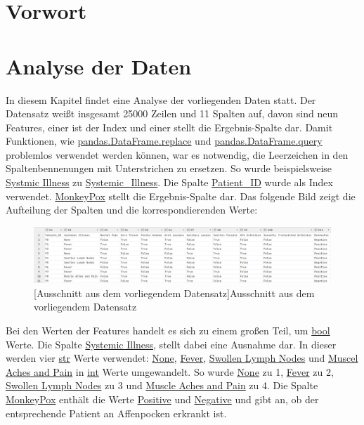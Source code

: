 \documentclass[13pt,a4paper, listof=entryprefix, bibliography=totocnumbered,toc=listofnumbered,lof=listofnumbered]{scrartcl}
\begin{document}

	\section{Vorwort}
		\label{ch:vorwort}


	\section{Analyse der Daten}
		\label{ch:analyse_daten}

	In diesem Kapitel findet eine Analyse der vorliegenden Daten statt. Der Datensatz weißt insgesamt 25000 Zeilen und 11 Spalten auf, davon sind 
	neun Features, einer ist der Index und einer stellt die Ergebnis-Spalte dar. Damit Funktionen, wie \url{pandas.DataFrame.replace} und 
	\url{pandas.DataFrame.query} problemlos verwendet werden können, war es notwendig, die Leerzeichen in den Spaltenbennenungen mit Unterstrichen zu ersetzen. 
	So wurde beispielsweise \url{Systmic Illness} zu \url{Systemic_Illness}.  Die Spalte \url{Patient_ID} wurde als Index verwendet. 
	\url{MonkeyPox} stellt die Ergebnis-Spalte dar. Das folgende Bild zeigt die Aufteilung der Spalten und die korrespondierenden Werte:

	\begin{figure}[H]
		\centering
		\includegraphics[width=0.8\linewidth]{Bilder/data_table.png}
		[Ausschnitt aus dem vorliegendem Datensatz]{Ausschnitt aus dem vorliegendem Datensatz}
		\label{fig:data_table}
	\end{figure}

	Bei den Werten der Features handelt es sich zu einem großen Teil, um \url{bool} Werte. Die Spalte \url{Systemic Illness}, stellt dabei eine Ausnahme dar. In dieser werden
	vier \url{str} Werte verwendet: \url{None}, \url{Fever}, \url{Swollen Lymph Nodes} und \url{Muscel Aches and Pain} in \url{int} Werte umgewandelt. So wurde \url{None} zu 1,
	\url{Fever} zu 2, \url{Swollen Lymph Nodes} zu 3 und \url{Muscle Aches and Pain} zu 4. Die Spalte \url{MonkeyPox} enthält die Werte \url{Positive} und \url{Negative} und gibt
	an, ob der entsprechende Patient an Affenpocken erkrankt ist.
\end{document}
